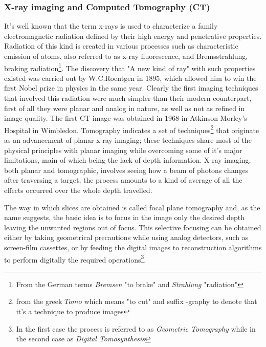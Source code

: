 \subsubsection{X-ray imaging and Computed Tomography (CT)}
It's well known that the term x-rays is used to characterize a family electromagnetic radiation defined by their high energy and penetrative properties. Radiation of this kind is created in various processes such as characteristic emission of atoms, also referred to as x-ray fluorescence, and Bremsstrahlung, braking radiation\footnote{From the German terms \textit{Bremsen} "to brake" and \textit{Strahlung} "radiation"}. The discovery that "A new kind of ray"\cite{Roentgen} with such properties existed was carried out by W.C.Roentgen in 1895, which allowed him to win the first Nobel prize in physics in the same year. Clearly the first imaging techniques that involved this radiation were much simpler than their modern counterpart, first of all they were planar and analog in nature, as well as not as refined in image quality. The first CT image was obtained in 1968 in Atkinson Morley's Hospital in Wimbledon. Tomography indicates a set of techniques\footnote{from the greek $\textit{Tomo}$ which means "to cut" and suffix -graphy to denote that it's a technique to produce images} that originate as an advancement of planar x-ray imaging; these techniques share most of the physical principles with planar imaging while overcoming some of it's major limitations, main of which being the lack of depth information.  X-ray imaging, both planar and tomographic, involves seeing how a beam of photons changes after traversing a target, the process amounts to a kind of average of all the effects occurred over the whole depth travelled.

The way in which slices are obtained is called focal plane tomography and, as the name suggests, the basic idea is to focus in the image only the desired depth leaving the unwanted regions out of focus. This selective focusing can be obtained either by taking geometrical precautions while using analog detectors, such as screen-film cassettes, or by feeding the digital images to reconstruction algorithms to perform digitally the required operations\footnote{In the first case the process is referred to as \textit{Geometric Tomography} while in the second case as \textit{Digital Tomosynthesis}}.

